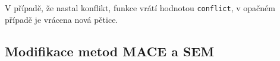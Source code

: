 V případě, že nastal konflikt, funkce
 vrátí hodnotou \texttt{conflict},
v opačném případě je vrácena nová pětice.

\subsection{Modifikace metod MACE a SEM}
